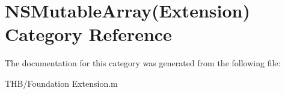 \hypertarget{category_n_s_mutable_array_07_extension_08}{}\section{N\+S\+Mutable\+Array(Extension) Category Reference}
\label{category_n_s_mutable_array_07_extension_08}


The documentation for this category was generated from the following file\+:\begin{DoxyCompactItemize}
\item 
T\+H\+B/Foundation Extension.\+m\end{DoxyCompactItemize}
